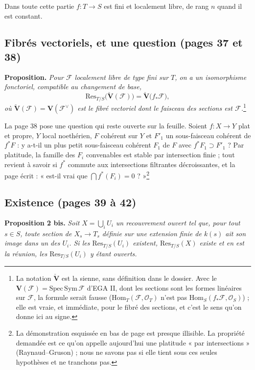 \documentclass[11pt,a4paper]{article}
\begin{document}
Dans toute cette partie $f : T \to S$ est fini et localement libre, de rang $n$
quand il est constant.

\subsection*{Fibrés vectoriels, et une question (pages 37 et 38)}

\textbf{Proposition.} \emph{Pour $\mathcal{F}$ localement libre de type fini sur
$T$, on a un isomorphisme fonctoriel, compatible au changement de base,
\[
  \mathrm{Res}_{T/S}\bigl(\check{\mathbf{V}}(\mathcal{F})\bigr) =
  \check{\mathbf{V}}\bigl(f_{*}\mathcal{F}\bigr),
\]
où $\check{\mathbf{V}}(\mathcal{F}) = \mathbf{V}(\mathcal{F}^{\vee})$ est le fibré
vectoriel dont le faisceau des sections est $\mathcal{F}$.}\footnote{La notation
$\check{\mathbf{V}}$ est la sienne, sans définition dans le dossier. Avec le
$\mathbf{V}(\mathcal{F}) = \mathrm{Spec}\,\mathrm{Sym}\,\mathcal{F}$ d'EGA II, dont les
sections sont les formes linéaires sur $\mathcal{F}$, la formule serait fausse
($\mathrm{Hom}_T(\mathcal{F}, \mathcal{O}_T)$ n'est pas
$\mathrm{Hom}_S(f_{*}\mathcal{F}, \mathcal{O}_S)$) ; elle est vraie, et immédiate,
pour le fibré des sections, et c'est le sens qu'on donne ici au signe.}

La page 38 pose une question qui reste ouverte sur la feuille. Soient $f : X
\to Y$ plat et propre, $Y$ local noethérien, $F$ cohérent sur $Y$ et $F'_1$ un
sous-faisceau cohérent de $f^{*}F$ : y a-t-il un plus petit sous-faisceau
cohérent $F_1$ de $F$ avec $f^{*}F_1 \supset F'_1$ ? Par platitude, la famille
des $F_i$ convenables est stable par intersection finie ; tout revient à
savoir si $f^{*}$ commute aux intersections filtrantes décroissantes, et la
page écrit : « est-il vrai que $\bigcap f^{*}(F_i) = 0$ ? »\footnote{La
démonstration esquissée en bas de page est presque illisible. La propriété
demandée est ce qu'on appelle aujourd'hui une platitude « par intersections »
(Raynaud--Gruson) ; nous ne savons pas si elle tient sous ces seules
hypothèses et ne tranchons pas.}

\subsection*{Existence (pages 39 à 42)}

\textbf{Proposition 2 bis.} \emph{Soit $X = \bigcup_i U_i$ un recouvrement
ouvert tel que, pour tout $s \in S$, toute section de $X_s \to T_s$ définie
sur une extension finie de $k(s)$ ait son image dans un des $U_i$. Si les
$\mathrm{Res}_{T/S}(U_i)$ existent, $\mathrm{Res}_{T/S}(X)$ existe et en est la
réunion, les $\mathrm{Res}_{T/S}(U_i)$ y étant ouverts.}
\end{document}
